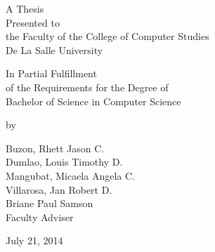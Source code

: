 %
%
%                 

\begin{titlepage}
\centering



\vspace{1.75cm}
A Thesis\\
Presented to\\
the Faculty of the College of Computer Studies\\
De La Salle University

\vspace{1.75cm}
In Partial Fulfillment\\
of the Requirements for the Degree of\\

Bachelor of Science in Computer Science

\vspace{1.75cm}
by\\
\vspace{1cm}

Buzon, Rhett Jason C.\\
Dumlao, Louis Timothy D.\\
Mangubat, Micaela Angela C.\\
Villarosa, Jan Robert D.\\

\vspace{1.75cm}
Briane Paul Samson \\
Faculty Adviser

\vspace{1.75cm}
July 21, 2014
\end{titlepage}
